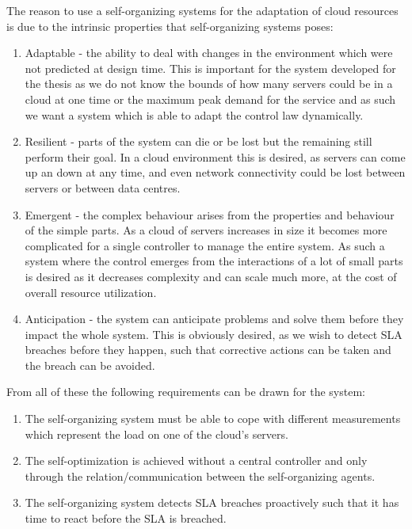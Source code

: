 The reason to use a self-organizing systems for the adaptation of cloud resources is due to the intrinsic properties that self-organizing systems poses:
\begin{enumerate}
	\item Adaptable - the ability to deal with changes in the environment which were not predicted at design time. This is important for the system developed for the thesis as we do not know the bounds of how many servers could be in a cloud at one time or the maximum peak demand for the service and as such we want a system which is able to adapt the control law dynamically.
	\item Resilient - parts of the system can die or be lost but the remaining still perform their goal. In a cloud environment this is desired, as servers can come up an down at any time, and even network connectivity could be lost between servers or between data centres.
	\item Emergent - the complex behaviour arises from the properties and behaviour of the simple parts. As a cloud of servers increases in size it becomes more complicated for a single controller to manage the entire system. As such a system where the control emerges from the interactions of a lot of small parts is desired as it decreases complexity and can scale much more, at the cost of overall resource utilization.
	\item Anticipation - the system can anticipate problems and solve them before they impact the whole system. This is obviously desired, as we wish to detect SLA breaches before they happen, such that corrective actions can be taken and the breach can be avoided.
\end{enumerate}

From all of these the following requirements can be drawn for the system:

\begin{enumerate}
	\item The self-organizing system must be able to cope with different measurements which represent the load on one of the cloud's servers.
	\item The self-optimization is achieved without a central controller and only through the relation/communication between the self-organizing agents.
	\item The self-organizing system detects SLA breaches proactively such that it has time to react before the SLA is breached.
\end{enumerate}

